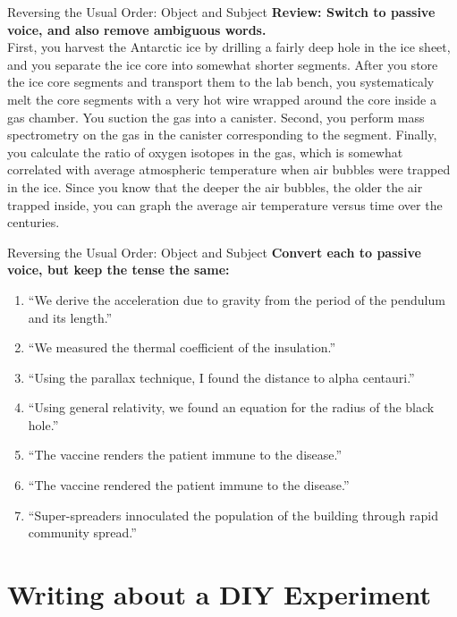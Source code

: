 \documentclass{beamer}
\begin{document}
\begin{frame}{Reversing the Usual Order: Object and Subject}
\small
\textbf{Review: Switch to passive voice, and also remove ambiguous words.} \\
First, you harvest the Antarctic ice by drilling a fairly deep hole in the ice sheet, and you separate the ice core into somewhat shorter segments.  After you store the ice core segments and transport them to the lab bench, you systematicaly melt the core segments with a very hot wire wrapped around the core inside a gas chamber.  You suction the gas into a canister.  Second, you perform mass spectrometry on the gas in the canister corresponding to the segment.  Finally, you calculate the ratio of oxygen isotopes in the gas, which is somewhat correlated with average atmospheric temperature when air bubbles were trapped in the ice.  Since you know that the deeper the air bubbles, the older the air trapped inside, you can graph the average air temperature versus time over the centuries.
\end{frame}

\begin{frame}{Reversing the Usual Order: Object and Subject}
\textbf{Convert each to passive voice, but keep the tense the same:}
\begin{enumerate}
\item ``We derive the acceleration due to gravity from the period of the pendulum and its length.''
\item ``We measured the thermal coefficient of the insulation.''
\item ``Using the parallax technique, I found the distance to alpha centauri.''
\item ``Using general relativity, we found an equation for the radius of the black hole.''
\item ``The vaccine renders the patient immune to the disease.''
\item ``The vaccine rendered the patient immune to the disease.''
\item ``Super-spreaders innoculated the population of the building through rapid community spread.''
\end{enumerate}
\end{frame}

\section{Writing about a DIY Experiment}
\end{document}
